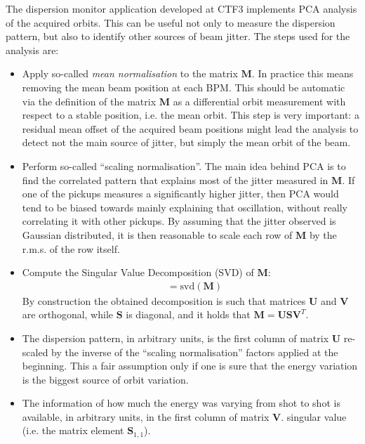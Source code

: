 The dispersion monitor application developed at CTF3 implements PCA analysis of the
acquired orbits. This can be useful not only to measure the dispersion pattern, but also
to identify other sources of beam jitter.
The steps used for the analysis are:
%
\begin{itemize}
\item
Apply so-called \emph{mean normalisation} to the matrix $\mathbf{M}$. In practice this
means removing the mean beam position at each BPM.
This should be automatic via the definition of the matrix $\mathbf{M}$ as a differential
orbit measurement with respect to a stable position, i.e. the mean orbit.
This step is very important: a residual mean offset of the acquired beam positions might
lead the analysis to detect not the main source of jitter, but simply the mean orbit of
the beam.
\item
Perform so-called ``scaling normalisation''. The main idea behind PCA is to find the
correlated pattern that explains most of the jitter measured in $\mathbf{M}$. 
If one of the pickups measures a significantly higher jitter, then PCA would tend to be
biased towards mainly explaining that oscillation, without really correlating it with
other pickups.
By assuming that the jitter observed is Gaussian distributed, it is then reasonable to
scale each row of $\mathbf{M}$ by the r.m.s. of the row itself.
\item
Compute the Singular Value Decomposition (SVD) of $\mathbf{M}$:
%
\begin{align}
[\mathbf{U}, \mathbf{S}, \mathbf{V}] &= \text{svd}(\mathbf{M})
\label{eq:svdDecompositionOfOrbitsGeneric}
\end{align}
%
By construction the obtained decomposition is such that 
matrices $\mathbf{U}$ and $\mathbf{V}$ are orthogonal, while $\mathbf{S}$ is diagonal,
and it holds that
$\mathbf{M}  = \mathbf{U} \mathbf{S} \mathbf{V}^T$.
\item
The dispersion pattern, in arbitrary units, is the first column of matrix $\mathbf{U}$
re-scaled by the inverse of the ``scaling normalisation'' factors applied at the
beginning.
This a fair assumption only if one is sure that the energy variation is the biggest
source of orbit variation.
\item
The information of how much the energy was varying from shot to shot is available, in
arbitrary units, in the first column of matrix $\mathbf{V}$. %
singular value (i.e. the matrix element $\mathbf{S}_{1,1}$).
\end{itemize}
